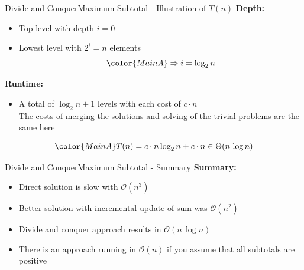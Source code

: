 
\begin{frame}{Divide and Conquer}{Maximum Subtotal - Illustration of $T(n)$}
  \textbf{Depth:}
  \begin{itemize}
    \item<2->
      Top level with depth {\color{MainA}$i = 0$}
    \item<3->
      Lowest level with {\color{MainA}$2^i = n$} elements
      \begin{displaymath}
        {\color{MainA}\Rightarrow i = \log_2 n}
      \end{displaymath}
  \end{itemize}
  \textbf{Runtime:}
  \begin{itemize}
    \item<5->
      A total of {\color{MainA}$\log_2 n + 1$} levels with each cost of
      {\color{MainA}$c \cdot n$}\\
      \color{gray}
      The costs of merging the solutions and solving of the trivial
      problems are the same here
  \end{itemize}
  \begin{displaymath}
    {\color{MainA}
    T(n) = c \cdot n \log_2 n + c \cdot n \in \Theta(n\,\log n)}
  \end{displaymath}
\end{frame}


\begin{frame}{Divide and Conquer}{Maximum Subtotal - Summary}
  \textbf{Summary:}
  \begin{itemize}
    \item<2->
      Direct solution is slow with {\color{MainA}$\mathcal{O}(n^3)$}
    \item<3->
      Better solution with incremental update of sum was
      {\color{MainA}$\mathcal{O}(n^2)$}
    \item<4->
      Divide and conquer approach results in
      {\color{MainA}$\mathcal{O}(n\,\log n)$}
    \item<5->
      There is an approach running in {\color{MainA}$\mathcal{O}(n)$}
      if you assume that all subtotals are positive
  \end{itemize}
\end{frame}



